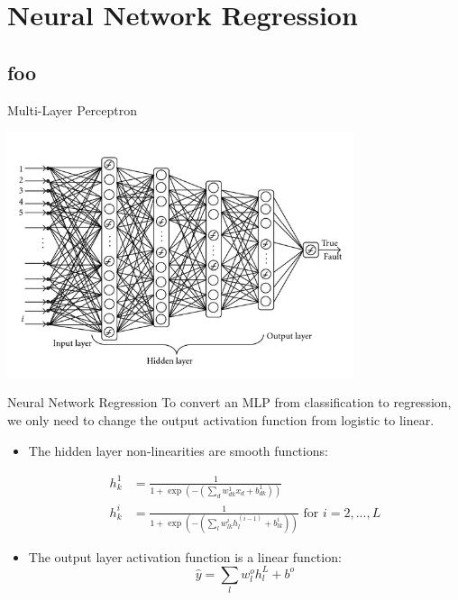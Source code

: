 \documentclass[serif,xcolor=pdftex,dvipsnames,table,hyperref={bookmarks=false,breaklinks}]{beamer}
\begin{document}
\section{Neural Network Regression}
\subsection{foo}

\begin{frame}[t]{Multi-Layer Perceptron}

\center
\includegraphics[width=4in]{../Figures/sigmoid_network.jpg}

\end{frame}


\begin{frame}[t]{Neural Network Regression}
To convert an MLP from classification to regression, we only need to change the output
activation function from logistic to linear.
\begin{itemize}
\setlength{\itemsep}{12pt}

\item The hidden layer non-linearities are smooth functions:

\begin{align*}
h^{1}_k &= \frac{1}{1+\exp(-(\sum_{d}w_{dk}^{1}x_d + b^1_{dk}))}\\
h^{i}_k &= \frac{1}{1+\exp(-(\sum_{l}w_{lk}^{i}h^{(i-1)}_l + b^i_{lk}))} \mbox { for } i=2,...,L
\end{align*}

\pause \item The output layer activation function is a linear function:
$$\hat{y} = \sum_{l} w_{l}^o h^{L}_l + b^o$$

\end{itemize}

\end{frame}
\end{document}
